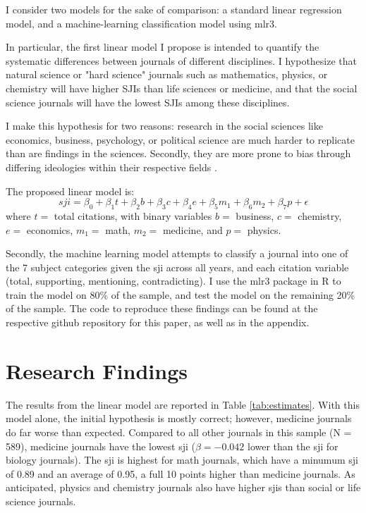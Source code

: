 \documentclass[12pt,english]{article}
\begin{document}
I consider two models for the sake of comparison: a standard linear regression model, and a machine-learning classification model using mlr3.

In particular, the first linear model I propose is intended to quantify the systematic differences between journals of different disciplines. I hypothesize that natural science or "hard science" journals such as mathematics, physics, or chemistry will have higher SJIs than life sciences or medicine, and that the social science journals will have the lowest SJIs among these disciplines.

I make this hypothesis for two reasons: research in the social sciences like economics, business, psychology, or political science are much harder to replicate than are findings in the sciences. Secondly, they are more prone to bias through differing ideologies within their respective fields \citep{duyx_scientific_2017}.

The proposed linear model is:
\begin{equation}
    sji = \beta_0 + \beta_1 t + \beta_2 b + \beta_3 c + \beta_4 e + \beta_5 m_1 + \beta_6 m_2 + \beta_7 p + \epsilon
\end{equation}
where $t =$ total citations, with binary variables $b =$ business, $c =$ chemistry, $e =$ economics, $m_1 =$ math, $m_2 =$ medicine, and $p =$ physics.

Secondly, the machine learning model attempts to classify a journal into one of the 7 subject categories given the sji across all years, and each citation variable (total, supporting, mentioning, contradicting). I use the mlr3 package in R to train the model on 80\% of the sample, and test the model on the remaining 20\% of the sample. The code to reproduce these findings can be found at the respective github repository for this paper, as well as in the appendix.

\section{Research Findings}\label{sec:results}
The results from the linear model are reported in Table \ref{tab:estimates}. With this model alone, the initial hypothesis is mostly correct; however, medicine journals do far worse than expected. Compared to all other journals in this sample (N = 589), medicine journals have the lowest sji ($\beta = -0.042$ lower than the sji for biology journals). The sji is highest for math journals, which have a minumum sji of 0.89 and an average of 0.95, a full 10 points higher than medicine journals. As anticipated, physics and chemistry journals also have higher sjis than social or life science journals. 
\end{document}
